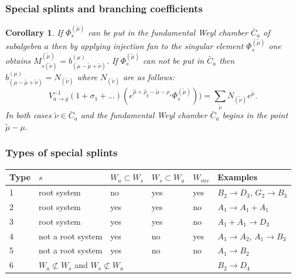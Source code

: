 \documentclass[pdftex]{beamer}
\newtheorem{Sl}{Corollary}
\theoremstyle{definition} \newtheorem{Def}{Definition}
\begin{document}
\begin{frame}
  \frametitle{Special splints and branching coefficients}
  \begin{Sl}
    If $\Phi_s^{(\tilde{\mu})}$ can be put in the fundamental Weyl chamber $\bar C_a$ of subalgebra $a$ then by applying injection fan to the singular element $\Phi_s^{(\tilde{\mu})}$ one obtains $M_{s (\tilde{\nu})}^{(\tilde{\mu})}=b_{(\mu-\tilde{\mu}+\tilde{\nu})}^{(\mu)}$. If $\Phi_s^{(\tilde{\mu})}$ can not be put in $\bar C_a$ then $b_{(\mu-\tilde{\mu}+\tilde{\nu})}^{(\mu)}=N_{(\tilde{\nu})}$ where $N_{(\tilde{\nu})}$ are as follows: $$V_{a\rightarrow g}^{-1}(1+\sigma_1+\dots)(e^{\hat\mu+\hat\rho_g-\tilde{\mu}-\rho_s}\Phi_s^{(\tilde{\mu})}))=\sum_{\tilde{\nu}} N_{(\tilde{\nu})}e^{\tilde{\mu}}.$$
    In both cases $\tilde{\nu}\in\bar C_a$ and the fundamental Weyl chamber $\bar C_a$ begins in the point $\tilde{\mu}-\mu$.
    \label{u31}
  \end{Sl}


\end{frame}

\begin{frame}
  \frametitle{Types of special splints}
  \begin{table}[h]
    \begin{tabular}[t]{|p{}|p{5em}|p{5em}|p{5em}|p{2em}|p{6em}|}
      \hline
      Type & $s$ & $W_a\subset W_s$ & $W_s\subset W_a$ & $W_{inv} $ & Examples \\
      \hline
      1 & root system & no & yes & yes  & $B_2\rightarrow D_3$, $G_2\rightarrow B_3$\\
      \hline
      2 & root system & yes & yes & no & $A_1\rightarrow A_1+A_1$ \\
      \hline
      3 & root system & yes & yes & no & $A_1+A_1\rightarrow D_3$ \\
      \hline
      4 & not a root system & yes & no & yes & $A_1\rightarrow A_2$, $A_1\rightarrow B_3$\\
      \hline
      5 & not a root system & yes & no & no  & $A_1\rightarrow B_2$\\
      \hline
      6 & \multicolumn{4}{|l|}{$W_a\not\subset W_s$ and $W_s\not\subset W_a$} & $B_2\rightarrow D_4$\\
      \hline
    \end{tabular}
    \label {spsp}
  \end{table}


\end{frame}
\end{document}
